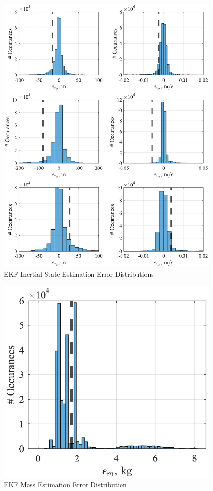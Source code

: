 \documentclass[letterpaper, paper,11pt]{AAS}		%
\begin{document}
\begin{figure}
	\centering 
	\includegraphics{./../../figures/EKFPosVelHist.eps}
	\caption{EKF Inertial State Estimation Error Distributions}
	\label{fig:EKFposvelhist}
\end{figure}

\begin{figure}
	\centering 
	\includegraphics{./../../figures/EKFMassHist.eps}
	\caption{EKF Mass Estimation Error Distribution}
	\label{fig:EKFmasshist}
\end{figure}
\end{document}
